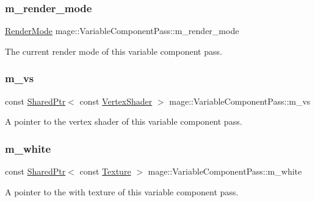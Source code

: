 \subsubsection{\texorpdfstring{m\+\_\+render\+\_\+mode}{m\_render\_mode}}
{\footnotesize\ttfamily \hyperlink{namespacemage_a5e7e18b0154373ce8fc942fe3f6b27fd}{Render\+Mode} mage\+::\+Variable\+Component\+Pass\+::m\+\_\+render\+\_\+mode\hspace{0.3cm}{\ttfamily [private]}}

The current render mode of this variable component pass. \hypertarget{classmage_1_1_variable_component_pass_a56ea86a6f78940fae934542eebdcb9e5}{}\label{classmage_1_1_variable_component_pass_a56ea86a6f78940fae934542eebdcb9e5} 
\subsubsection{\texorpdfstring{m\+\_\+vs}{m\_vs}}
{\footnotesize\ttfamily const \hyperlink{namespacemage_a1e01ae66713838a7a67d30e44c67703e}{Shared\+Ptr}$<$ const \hyperlink{classmage_1_1_vertex_shader}{Vertex\+Shader} $>$ mage\+::\+Variable\+Component\+Pass\+::m\+\_\+vs\hspace{0.3cm}{\ttfamily [private]}}

A pointer to the vertex shader of this variable component pass. \hypertarget{classmage_1_1_variable_component_pass_a2b018f6481e6e5aa043223ce6821725d}{}\label{classmage_1_1_variable_component_pass_a2b018f6481e6e5aa043223ce6821725d} 
\subsubsection{\texorpdfstring{m\+\_\+white}{m\_white}}
{\footnotesize\ttfamily const \hyperlink{namespacemage_a1e01ae66713838a7a67d30e44c67703e}{Shared\+Ptr}$<$ const \hyperlink{classmage_1_1_texture}{Texture} $>$ mage\+::\+Variable\+Component\+Pass\+::m\+\_\+white\hspace{0.3cm}{\ttfamily [private]}}

A pointer to the with texture of this variable component pass. 